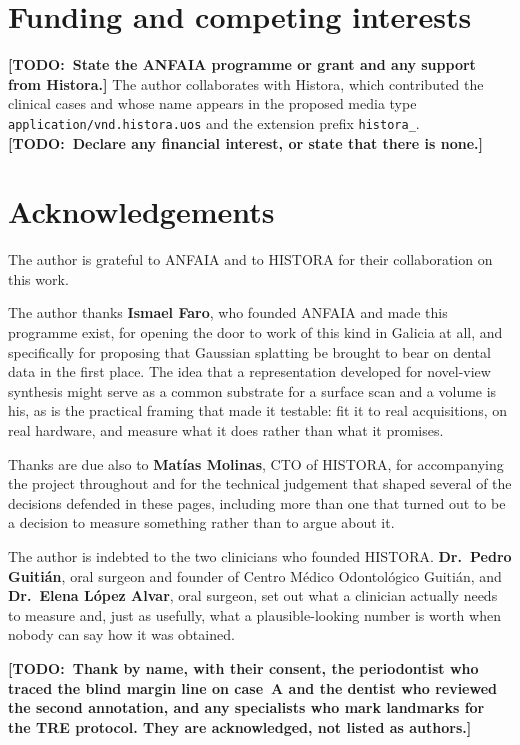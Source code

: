 \documentclass[11pt,a4paper]{article}
\newcommand{\code}[1]{\texttt{\small #1}}
\newif\iffinal \finalfalse
\newcommand{\todo}[1]{\iffinal\errmessage{Unresolved TODO left in the paper}\else
  {\color{red}\bfseries[TODO:~#1]}\fi}
\begin{document}
\section*{Funding and competing interests}

\todo{State the ANFAIA programme or grant and any support from Histora.} The author
collaborates with Histora, which contributed the clinical cases and whose name appears in the
proposed media type \code{application/vnd.histora.uos} and the extension prefix
\code{histora\_}. \todo{Declare any financial interest, or state that there is none.}

\newpage

\section*{Acknowledgements}

The author is grateful to ANFAIA and to HISTORA for their collaboration on this work.

The author thanks \textbf{Ismael Faro}, who founded ANFAIA and made this programme exist, for opening
the door to work of this kind in Galicia at all, and specifically for proposing that
Gaussian splatting be brought to bear on dental data in the first place. The idea that a
representation developed for novel-view synthesis might serve as a common substrate for a
surface scan and a volume is his, as is the practical framing that made it testable: fit it
to real acquisitions, on real hardware, and measure what it does rather than what it
promises.

Thanks are due also to \textbf{Matías Molinas}, CTO of
HISTORA, for accompanying the project throughout and for the technical judgement that
shaped several of the decisions defended in these pages, including more than one that
turned out to be a decision to measure something rather than to argue about it.

The author is indebted to the two clinicians who founded HISTORA. \textbf{Dr.\ Pedro Guitián}, oral
surgeon and founder of Centro Médico Odontológico Guitián, and \textbf{Dr.\ Elena López
Alvar}, oral surgeon, set out what a clinician actually needs to measure and, just as
usefully, what a plausible-looking number is worth when nobody can say how it was obtained.

\todo{Thank by name, with their consent, the periodontist who traced the blind margin line
on case~A and the dentist who reviewed the second annotation, and any specialists who mark
landmarks for the TRE protocol. They are acknowledged, not listed as authors.}
\end{document}
